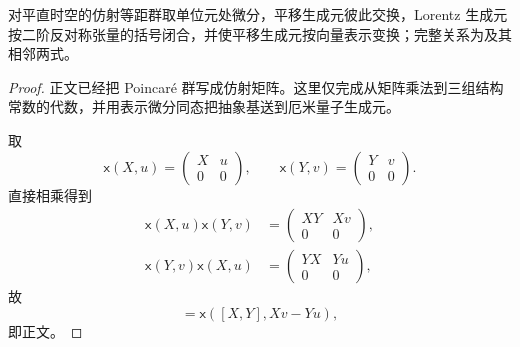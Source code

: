 \begin{theorem}
对平直时空的仿射等距群取单位元处微分，平移生成元彼此交换，Lorentz 生成元按二阶反对称张量的括号闭合，并使平移生成元按向量表示变换；完整关系为及其相邻两式。
\end{theorem}
\begin{proof}
正文已经把 Poincar\'e 群写成仿射矩阵。这里仅完成从矩阵乘法到三组结构常数的代数，并用表示微分同态把抽象基送到厄米量子生成元。

取
\begin{equation*}
 \mathsf x(X,u)=
 \begin{pmatrix}X&u\\0&0\end{pmatrix},
 \qquad
 \mathsf x(Y,v)=
 \begin{pmatrix}Y&v\\0&0\end{pmatrix}.
\end{equation*}
直接相乘得到
\begin{align*}
 \mathsf x(X,u)\mathsf x(Y,v)
 &=\begin{pmatrix}XY&Xv\\0&0\end{pmatrix},\\
 \mathsf x(Y,v)\mathsf x(X,u)
 &=\begin{pmatrix}YX&Yu\\0&0\end{pmatrix},
\end{align*}
故
\begin{equation*}
 [\mathsf x(X,u),\mathsf x(Y,v)]
 =\mathsf x([X,Y],Xv-Yu),
\end{equation*}
即正文。


\end{proof}
